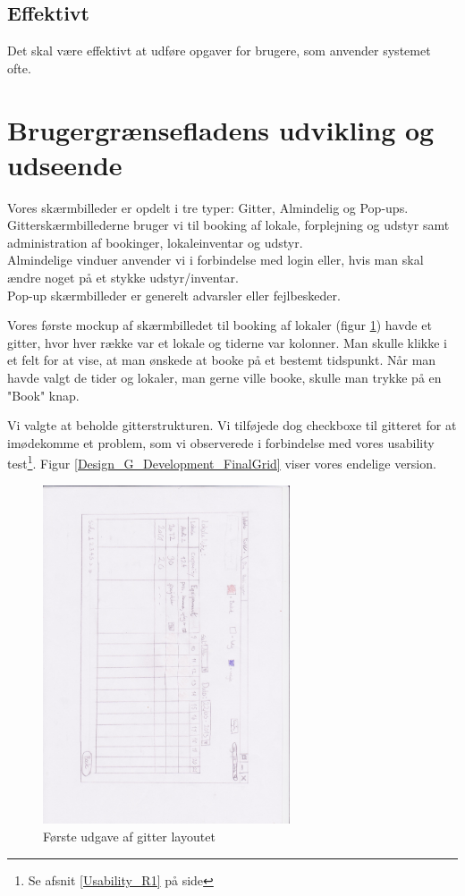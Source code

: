 \subsection{Effektivt}
Det skal være effektivt at udføre opgaver for brugere, som anvender systemet ofte.

\section{Brugergrænsefladens udvikling og udseende}
\label{Design_G_Development}
Vores skærmbilleder er opdelt i tre typer: Gitter, Almindelig og Pop-ups. 
\\Gitterskærmbillederne bruger vi til booking af lokale, forplejning og udstyr samt administration af bookinger, lokaleinventar og udstyr.
\\Almindelige vinduer anvender vi i forbindelse med login eller, hvis man skal ændre noget på et stykke udstyr/inventar.
\\Pop-up skærmbilleder er generelt advarsler eller fejlbeskeder.

Vores første mockup af skærmbilledet til booking af lokaler (figur \ref{Design_G_Development_FirstGrid}) havde et gitter, hvor hver række var et lokale og tiderne var kolonner. Man skulle klikke i et felt for at vise, at man ønskede at booke på et bestemt tidspunkt. Når man havde valgt de tider og lokaler, man gerne ville booke, skulle man trykke på en "Book" knap. 

Vi valgte at beholde gitterstrukturen. Vi tilføjede dog checkboxe til gitteret for at imødekomme et problem, som vi observerede i forbindelse med vores usability test\footnote{Se afsnit \ref{Usability_R1} på side \pageref{Usability_R1}}. Figur \ref{Design_G_Development_FinalGrid} viser vores endelige version.

\begin{figure}[h!]
  \centering
    \includegraphics[angle=90, width=0.65\textwidth]{Appendix/GUI-Prototype/PaperMockup/LokaleListe_001}
  \caption{Første udgave af gitter layoutet}
\label{Design_G_Development_FirstGrid}
\end{figure}

